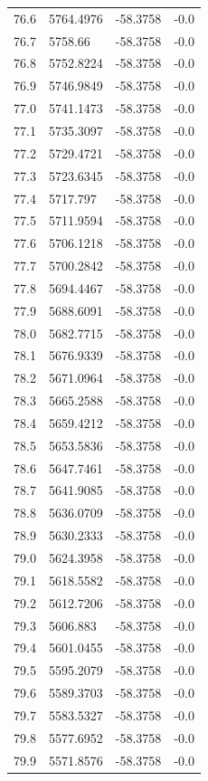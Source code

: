 \begin{table}[H]
\begin{tabular}{llll}
76.6 & 5764.4976 & -58.3758 & -0.0 \\
76.7 & 5758.66 & -58.3758 & -0.0 \\
76.8 & 5752.8224 & -58.3758 & -0.0 \\
76.9 & 5746.9849 & -58.3758 & -0.0 \\
77.0 & 5741.1473 & -58.3758 & -0.0 \\
77.1 & 5735.3097 & -58.3758 & -0.0 \\
77.2 & 5729.4721 & -58.3758 & -0.0 \\
77.3 & 5723.6345 & -58.3758 & -0.0 \\
77.4 & 5717.797 & -58.3758 & -0.0 \\
77.5 & 5711.9594 & -58.3758 & -0.0 \\
77.6 & 5706.1218 & -58.3758 & -0.0 \\
77.7 & 5700.2842 & -58.3758 & -0.0 \\
77.8 & 5694.4467 & -58.3758 & -0.0 \\
77.9 & 5688.6091 & -58.3758 & -0.0 \\
78.0 & 5682.7715 & -58.3758 & -0.0 \\
78.1 & 5676.9339 & -58.3758 & -0.0 \\
78.2 & 5671.0964 & -58.3758 & -0.0 \\
78.3 & 5665.2588 & -58.3758 & -0.0 \\
78.4 & 5659.4212 & -58.3758 & -0.0 \\
78.5 & 5653.5836 & -58.3758 & -0.0 \\
78.6 & 5647.7461 & -58.3758 & -0.0 \\
78.7 & 5641.9085 & -58.3758 & -0.0 \\
78.8 & 5636.0709 & -58.3758 & -0.0 \\
78.9 & 5630.2333 & -58.3758 & -0.0 \\
79.0 & 5624.3958 & -58.3758 & -0.0 \\
79.1 & 5618.5582 & -58.3758 & -0.0 \\
79.2 & 5612.7206 & -58.3758 & -0.0 \\
79.3 & 5606.883 & -58.3758 & -0.0 \\
79.4 & 5601.0455 & -58.3758 & -0.0 \\
79.5 & 5595.2079 & -58.3758 & -0.0 \\
79.6 & 5589.3703 & -58.3758 & -0.0 \\
79.7 & 5583.5327 & -58.3758 & -0.0 \\
79.8 & 5577.6952 & -58.3758 & -0.0 \\
79.9 & 5571.8576 & -58.3758 & -0.0 \\

\end{tabular}
\end{table}
